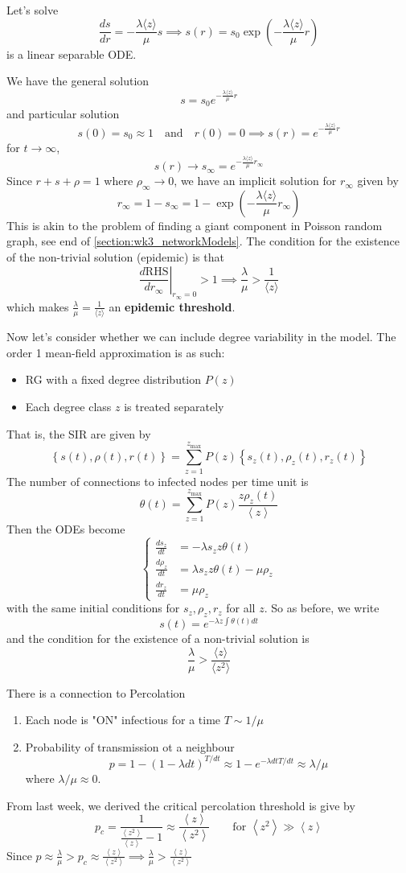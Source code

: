 \documentclass[12pt]{article}
\theoremstyle{definition}
\newcommand{\ip}[1]{\left\langle{#1}\right\rangle}
\newcommand{\br}[1]{\left({#1}\right)}
\newcommand{\cur}[1]{\left\{{#1}\right\}}
\begin{document}
Let's solve
\[ \frac{ds}{dr} = -\frac{\lambda \langle z\rangle}{\mu} s \implies s(r) = s_0\exp \left(-\frac{\lambda \langle z\rangle}{\mu} r\right) \]
is a linear separable ODE.

We have the general solution
\[
s=s_0 e^{-\frac{\lambda\langle z\rangle}{\mu}r}
\]
and particular solution
\[
s(0)=s_0\approx 1 \quad\text{and}\quad r(0)=0 \implies s(r)=e^{-\frac{\lambda\langle z\rangle}{\mu}r}
\]
for $t\to\infty$, 
\[
s(r)\to s_\infty=e^{-\frac{\lambda\langle z\rangle}{\mu}r_\infty}
\]
Since $r+s+\rho = 1$ where $\rho_\infty\to 0$, we have an implicit solution for $r_{\infty}$ given by 
\[
r_\infty = 1-s_\infty = 1- \exp\br{-\frac{\lambda\langle z\rangle}{\mu}r_\infty}
\]
This is akin to the problem of finding a giant component in Poisson random graph, see end of \cref{section:wk3_networkModels}. The condition for the existence of the non-trivial solution (epidemic) is that
\[
\left.\frac{d \text{RHS}}{dr_\infty}\right|_{r_\infty=0}>1 \implies \frac \lambda \mu > \frac{1}{\langle z\rangle}
\]
which makes $\frac{\lambda}{\mu}=\frac{1}{\langle z\rangle}$ an \textbf{epidemic threshold}. 

Now let's consider whether we can include degree variability in the model. The order 1 mean-field approximation is as such:
\begin{itemize}
    \item RG with a fixed degree distribution $P(z)$
    \item Each degree class $z$ is treated separately
\end{itemize}
That is, the SIR are given by 
\[
\cur{s(t),\rho(t),r(t)} = \sum_{z=1}^{z_{\max}} P(z) \cur{s_z(t),\rho_z(t),r_z(t)}
\]
The number of connections to infected nodes per time unit is 
\[
\theta(t) = \sum_{z=1}^{z_{\max}} P(z)\frac{z\rho_z(t)}{\ip{z}}
\]
Then the ODEs become
\[
\begin{cases}
    \frac{ds_z}{dt} &= -\lambda s_z z\theta(t) \\
    \frac{d\rho_z}{dt} &= \lambda s_z z\theta(t)-\mu\rho_z \\
    \frac{dr_z}{dt} &= \mu\rho_z
\end{cases}
\]
with the same initial conditions for $s_z,\rho_z,r_z$ for all $z$. So as before, we write
\[
s(t)=e^{-\lambda z\int\theta(t)dt}
\]
and the condition for the existence of a non-trivial solution is
\[
\frac{\lambda}{\mu} > \frac{\langle z\rangle}{\langle z^2\rangle}
\]


There is a connection to Percolation
\begin{enumerate}
    \item Each node is "ON" infectious for a time $T\sim 1/\mu$ 
    \item Probability of transmission ot a neighbour
    \[p=1-(1-\lambda dt)^{T/dt} \approx 1-e^{-\lambda dt T/dt} \approx \lambda / \mu\]
    where $\lambda / \mu \approx 0$.
\end{enumerate}
From last week, we derived the critical percolation threshold is give by 
\[
p_c =\frac{1}{\frac{\ip{z^2}}{\ip{z}}-1} \approx \frac{\ip{z}}{\ip{z^2}} \qquad \text{for } \ip{z^2} \gg \ip{z}
\]
Since $p\approx \frac{\lambda}{\mu}>p_c \approx \frac{\ip{z}}{\ip{z^2}} \implies \frac{\lambda}{\mu} > \frac{\ip{z}}{\ip{z^2}} $
\end{document}
